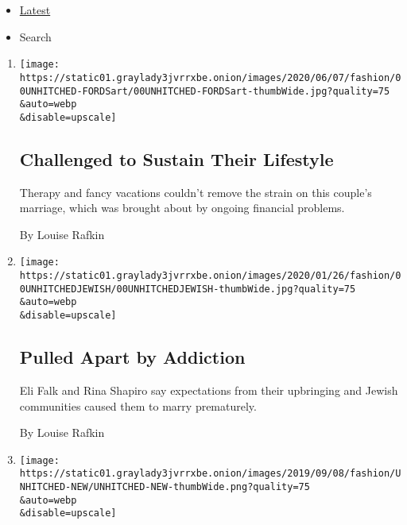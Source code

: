 \begin{itemize}
\tightlist
\item
  \protect\hyperlink{stream-panel}{Latest}
\item
  Search
\end{itemize}

\begin{enumerate}
\def\labelenumi{\arabic{enumi}.}
\item
  \href{/2020/06/03/fashion/weddings/Unhitched-couple-discusses-their-marriage-and-divorce.html}{}

  \texttt{[image: https://static01.graylady3jvrrxbe.onion/images/2020/06/07/fashion/00UNHITCHED-FORDSart/00UNHITCHED-FORDSart-thumbWide.jpg?quality=75\\\&auto=webp\\\&disable=upscale]}

  \hypertarget{challenged-to-sustain-their-lifestyle}{%
  \subsection{Challenged to Sustain Their
  Lifestyle}\label{challenged-to-sustain-their-lifestyle}}

  Therapy and fancy vacations couldn't remove the strain on this
  couple's marriage, which was brought about by ongoing financial
  problems.

  By Louise Rafkin
\item
  \href{/2020/01/27/fashion/weddings/Unhitched-couple-is-pulled-apart-by-addiction.html}{}

  \texttt{[image: https://static01.graylady3jvrrxbe.onion/images/2020/01/26/fashion/00UNHITCHEDJEWISH/00UNHITCHEDJEWISH-thumbWide.jpg?quality=75\\\&auto=webp\\\&disable=upscale]}

  \hypertarget{pulled-apart-by-addiction}{%
  \subsection{Pulled Apart by
  Addiction}\label{pulled-apart-by-addiction}}

  Eli Falk and Rina Shapiro say expectations from their upbringing and
  Jewish communities caused them to marry prematurely.

  By Louise Rafkin
\item
  \href{/interactive/2019/09/07/multimedia/how-to-get-divorced.html}{}

  \texttt{[image: https://static01.graylady3jvrrxbe.onion/images/2019/09/08/fashion/UNHITCHED-NEW/UNHITCHED-NEW-thumbWide.png?quality=75\\\&auto=webp\\\&disable=upscale]}


\end{enumerate}
